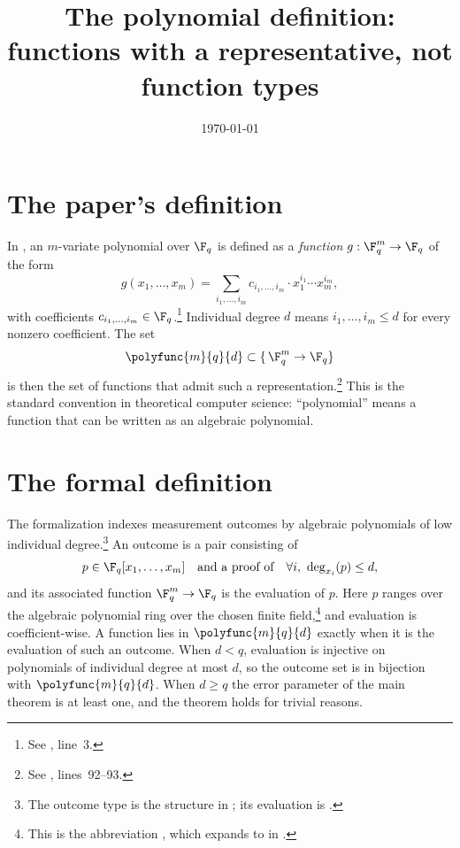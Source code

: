 \documentclass{article}
\title{The polynomial definition: functions with a representative,
not function types}
\author{}
\date{\today}
\begin{document}
\maketitle

\section{The paper's definition}

In \cite{Ji2020LowIndividualDegree}, an $m$-variate polynomial over
$\F_q$ is defined as a \emph{function}
$g : \F_q^m \to \F_q$ of the form
\[
  g(x_1,\dots,x_m) = \sum_{i_1,\dots,i_m}
    c_{i_1,\dots,i_m} \cdot x_1^{i_1}\cdots x_m^{i_m},
\]
with coefficients $c_{i_1,\dots,i_m} \in
\F_q$.\footnote{See ,
line~3.}
Individual degree $d$ means $i_1,\dots,i_m \le d$ for every nonzero
coefficient. The set
\[
  \polyfunc{m}{q}{d}
  \subset  \{\, \F_q^m \to \F_q \}
\]
is then the set of functions that admit such a
representation.\footnote{See
, lines~92--93.}
This is the standard convention in theoretical computer science:
``polynomial'' means a function that can be written as an algebraic
polynomial.

\section{The formal definition}

The formalization indexes measurement outcomes by algebraic
polynomials of low individual degree.\footnote{The outcome type is the
structure  in
; its evaluation is
.}  An outcome is a pair
consisting of
\[
  p \in \F_q[x_1,\dots,x_m]
  \quad\text{and a proof of}\quad
  \forall i,\ \deg_{x_i}(p) \le d,
\]
and its associated function $\F_q^m \to \F_q$ is the evaluation of
$p$.  Here $p$ ranges over the algebraic polynomial ring over the chosen
finite field,\footnote{This is the abbreviation
, which expands to
 in
.}
and evaluation is coefficient-wise.  A function lies in
$\polyfunc{m}{q}{d}$ exactly when it is the evaluation of such an outcome.
When $d<q$, evaluation is injective on polynomials of individual degree at
most $d$, so the outcome set is in bijection with $\polyfunc{m}{q}{d}$.
When $d\ge q$ the error parameter of the main theorem is at least one, and
the theorem holds for trivial reasons.
\end{document}
